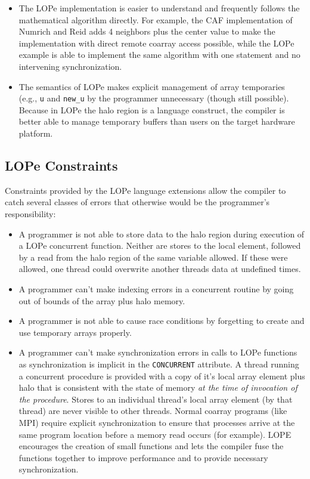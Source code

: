 \begin{itemize}
\item
The LOPe implementation is easier to understand and frequently follows the mathematical algorithm
directly.  For example, the CAF implementation of Numrich and Reid adds 4 neighbors plus the center
value to make the implementation with direct remote coarray access possible, while the LOPe example
is able to implement the same algorithm with one statement and no intervening synchronization.

\item
The semantics of LOPe makes explicit management of array temporaries (e.g., \texttt{u} and
\texttt{new\_u} by the programmer unnecessary (though still possible).  Because in LOPe the
halo region is a language construct, the compiler is better able to manage temporary
buffers than users on the target hardware platform.

\end{itemize}

\subsection{LOPe Constraints}

Constraints provided by the LOPe language extensions allow the compiler to catch several classes of
errors that otherwise would be the programmer's responsibility:

\begin{itemize}

\item
A programmer is not able to store data to the halo region during execution of a LOPe concurrent
function.  Neither are stores to the local element, followed by a read from the halo region of the
same variable allowed.  If these were allowed, one thread could overwrite another threads data at
undefined times.

\item
A programmer can't make indexing errors in a concurrent routine by going out of bounds of the array
plus halo memory.

\item
A programmer is not able to cause race conditions by forgetting to create and use temporary arrays
properly.

\item
A programmer can't make synchronization errors in calls to LOPe functions as synchronization is
implicit in the \texttt{CONCURRENT} attribute.  A thread running a concurrent procedure is provided
with a copy of it's local array element plus halo that is consistent with the state of memory
\emph{at the time of invocation of the procedure}.  Stores to an individual thread's local array
element (by that thread) are never visible to other threads.  Normal coarray programs (like MPI)
require explicit synchronization to ensure that processes arrive at the same program location
before a memory read occurs (for example).  LOPE encourages the creation of small functions and
lets the compiler fuse the functions together to improve performance and to provide necessary
synchronization.

\end{itemize}
